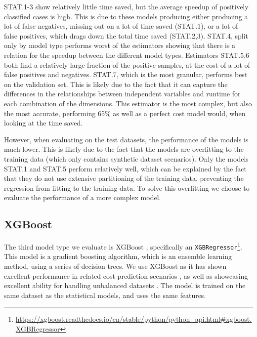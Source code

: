 STAT.1-3 show relatively little time saved, but the average speedup of positively classified cases is high. This is due to these models producing either producing a lot of false negatives, missing out on a lot of time saved (STAT.1), or a lot of false positives, which drags down the total time saved (STAT.2,3). STAT.4, split only by model type performs worst of the estimators showing that there is a relation for the speedup between the different model types. Estimators STAT.5,6 both find a relatively large fraction of the positive samples, at the cost of a lot of false positives and negatives. STAT.7, which is the most granular, performs best on the validation set. This is likely due to the fact that it can capture the differences in the relationships between independent variables and runtime for each combination of the dimensions. This estimator is the most complex, but also the most accurate, performing 65\% as well as a perfect cost model would, when looking at the time saved.

However, when evaluating on the test datasets, the performance of the models is much lower. This is likely due to the fact that the models are overfitting to the training data (which only contains synthetic dataset scenarios). Only the models STAT.1 and STAT.5 perform relatively well, which can be explained by the fact that they do not use extensive partitioning of the training data, preventing the regression from fitting to the training data. To solve this overfitting we choose to evaluate the performance of a more complex model.

\subsection{XGBoost}
\label{subsec:5-xgboost}
The third model type we evaluate is XGBoost \cite{xgboost}, specifically an \texttt{XGBRegressor}\footnote{\url{https://xgboost.readthedocs.io/en/stable/python/python_api.html\#xgboost.XGBRegressor}}. This model is a gradient boosting algorithm, which is an ensemble learning method, using a series of decision trees. We use XGBoost as it has shown excellent performance in related cost prediction scenarios \cite{tvm}, as well as showcasing excellent ability for handling unbalanced datasets \cite{xgboost_imbalanced_data}. The model is trained on the same dataset as the statistical models, and uses the same features.

